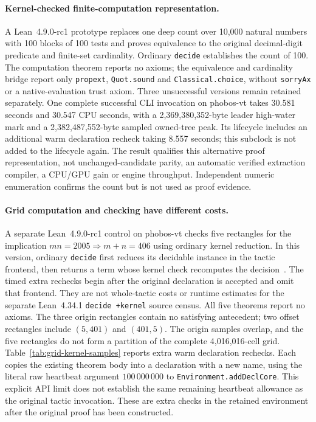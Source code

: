 \documentclass[10pt,twocolumn]{article}
\begin{document}
\paragraph{Kernel-checked finite-computation representation.}
A Lean~4.9.0-rc1 prototype replaces one deep count over 10,000 natural numbers
with 100 blocks of 100 tests and proves equivalence to the original
decimal-digit predicate and finite-set cardinality. Ordinary \texttt{decide}
establishes the count of 100. The computation theorem reports no axioms;
the equivalence and cardinality bridge report only \texttt{propext},
\texttt{Quot.sound} and \texttt{Classical.choice}, without \texttt{sorryAx}
or a native-evaluation trust axiom. Three unsuccessful versions remain
retained separately.
One complete successful CLI invocation on phobos-vt takes 30.581 seconds
and 30.547 CPU seconds, with a 2,369,380,352-byte leader high-water mark
and a 2,382,487,552-byte sampled owned-tree peak. Its lifecycle includes an
additional warm declaration recheck taking 8.557 seconds; this subclock
is not added to the lifecycle again. The result qualifies this alternative
proof representation, not unchanged-candidate parity, an automatic verified
extraction compiler, a CPU/GPU gain or engine throughput. Independent numeric
enumeration confirms the count but is not used as proof evidence.

\paragraph{Grid computation and checking have different costs.}
A separate Lean~4.9.0-rc1 control on phobos-vt checks five rectangles for the
implication $mn=2005\Rightarrow m+n=406$ using ordinary kernel reduction.
In this version, ordinary \texttt{decide} first reduces its decidable
instance in the tactic frontend, then returns a term whose kernel check
recomputes the decision~\cite{lean49DecideSource}. The timed extra rechecks
begin after the original declaration is accepted and omit that frontend.
They are not whole-tactic costs or runtime estimates for the separate
Lean~4.34.1 \texttt{decide +kernel} source census.
All five theorems report no axioms. The three origin rectangles contain no
satisfying antecedent; two offset rectangles include $(5,401)$ and $(401,5)$.
The origin samples overlap, and the five rectangles do not form a partition
of the complete 4,016,016-cell grid.
Table~\ref{tab:grid-kernel-samples} reports extra warm declaration rechecks.
Each copies the existing theorem body into a declaration with a new name,
using the literal raw heartbeat argument $100\,000\,000$ to
\texttt{Environment.addDeclCore}. This explicit API limit does not establish
the same remaining heartbeat allowance as the original tactic invocation.
These are extra checks in the retained environment after the original proof
has been constructed.
\end{document}
